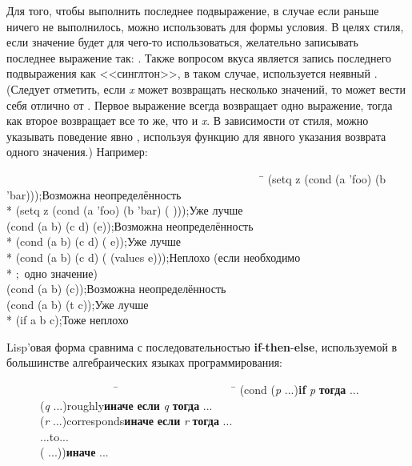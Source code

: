 \begin{defmac}
Для того, чтобы выполнить последнее подвыражение, в случае если раньше ничего не
выполнилось, можно использовать {\true} для формы условия.
В целях стиля, если значение  будет для чего-то использоваться,
желательно записывать последнее выражение так: \cd{({\true} {\false})}.
Также вопросом вкуса является запись последнего подвыражения  как
<<синглтон>>, в таком случае, используется неявный {\true}.
(Следует отметить, если \emph{x} может возвращать несколько значений, то
 может вести себя отлично от 
. Первое выражение всегда возвращает одно
выражение, тогда как второе возвращает все то же, что и \emph{x}. В зависимости
от стиля, можно указывать поведение явно ,
используя функцию  для явного указания возврата одного значения.)
Например:
\begin{lisp}
~~~~~~~~~~~~~~~~~~~~~~~~~~~~~~~~~~~~~~~~~~~~~~\=\kill
(setq z (cond (a 'foo) (b 'bar)))\>;\textrm{Возможна неопределённость} \\*
(setq z (cond (a 'foo) (b 'bar) ({\true} {\false})))\>;\textrm{Уже лучше} \\
(cond (a b) (c d) (e))\>;\textrm{Возможна неопределённость} \\*
(cond (a b) (c d) ({\true} e))\>;\textrm{Уже лучше} \\*
(cond (a b) (c d) ({\true} (values e)))\>;\textrm{Неплохо (если необходимо} \\*
                                       \>;~\textrm{одно значение)} \\
(cond (a b) (c))\>;\textrm{Возможна неопределённость} \\
(cond (a b) (t c))\>;\textrm{Уже лучше} \\*
(if a b c)\>;\textrm{Тоже неплохо}
\end{lisp}
Lisp'овая форма  сравнима с последовательностью
\textbf{if}-\textbf{then}-\textbf{else}, используемой в большинстве
алгебраических языках программирования:
\begin{lisp}
~~~~~~~~~~~~~~~~~~~~\=~~~~~~~~~~~~~~~~~~~~~\=\kill
(cond (\emph{p} ...)\>\>\textbf{if} \emph{p} \textbf{тогда} ... \\
~~~~~~(\emph{q} ...)\>\textrm{roughly}\>\textbf{иначе} \textbf{если} \emph{q} \textbf{тогда} ... \\
~~~~~~(\emph{r} ...)\>\textrm{corresponds}\>\textbf{иначе} \textbf{если} \emph{r} \textbf{тогда} ... \\
~~~~~~...\>\textrm{to}\>... \\
~~~~~~({\true} ...))\>\>\textbf{иначе} ...
\end{lisp}
\end{defmac}

